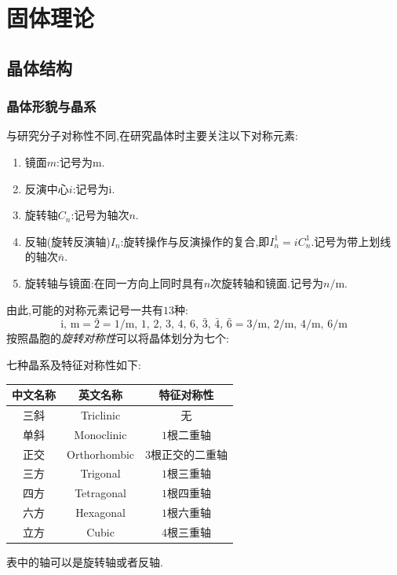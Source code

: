 \documentclass{ctexbook}
\begin{document}
\chapter{固体理论}
\section{晶体结构}
\subsection{晶体形貌与晶系}
与研究分子对称性不同,在研究晶体时主要关注以下对称元素:
\begin{theorem}[晶体的对称性与相应的对称元素记号]
    \begin{enumerate}[label=\tbf{\roman*.}]
        \item 镜面$m$:记号为$\text{m}$.
        \item 反演中心$i$:记号为$\text{i}$.
        \item 旋转轴$C_n$:记号为轴次$n$.
        \item 反轴(旋转反演轴)$I_n$:旋转操作与反演操作的复合,即$I_n^1=iC_n^1$.记号为带上划线的轴次$\bar{n}$.
        \item 旋转轴与镜面:在同一方向上同时具有$n$次旋转轴和镜面.记号为$n/\text{m}$.
    \end{enumerate}
\end{theorem}
由此,可能的对称元素记号一共有$13$种:
\[\text{i},\,\text{m}=\bar{2}=1/\text{m},\,1,\,2,\,3,\,4,\,6,\,\bar{3},\,\bar{4},\,\bar{6}=3/\text{m},\,2/\text{m},\,4/\text{m},\,6/\text{m}\]
按照晶胞的\textit{旋转对称性}可以将晶体划分为七个:
\begin{definition}[晶系]
    七种晶系及特征对称性如下:
    \begin{table}[H]\centering
        \begin{tabular}{ccc}\hline
            中文名称 & 英文名称 & 特征对称性\\\hline
            三斜 & Triclinic & 无 \\
            单斜 & Monoclinic & $1$根二重轴\\
            正交 & Orthorhombic & $3$根正交的二重轴\\
            三方 & Trigonal & $1$根三重轴\\
            四方 & Tetragonal & $1$根四重轴\\
            六方 & Hexagonal & $1$根六重轴\\
            立方 & Cubic & $4$根三重轴\\\hline
        \end{tabular}
    \end{table}
    表中的轴可以是旋转轴或者反轴.
\end{definition}
\end{document}
